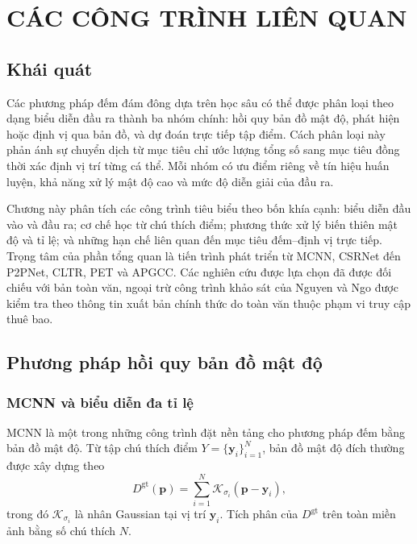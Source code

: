 \chapter{CÁC CÔNG TRÌNH LIÊN QUAN}
\label{chap:related-work}

\section{Khái quát}

Các phương pháp đếm đám đông dựa trên học sâu có thể được phân loại theo dạng biểu diễn đầu ra thành ba nhóm chính: hồi quy bản đồ mật độ, phát hiện hoặc định vị qua bản đồ, và dự đoán trực tiếp tập điểm. Cách phân loại này phản ánh sự chuyển dịch từ mục tiêu chỉ ước lượng tổng số sang mục tiêu đồng thời xác định vị trí từng cá thể. Mỗi nhóm có ưu điểm riêng về tín hiệu huấn luyện, khả năng xử lý mật độ cao và mức độ diễn giải của đầu ra.

Chương này phân tích các công trình tiêu biểu theo bốn khía cạnh: biểu diễn đầu vào và đầu ra; cơ chế học từ chú thích điểm; phương thức xử lý biến thiên mật độ và tỉ lệ; và những hạn chế liên quan đến mục tiêu đếm--định vị trực tiếp. Trọng tâm của phần tổng quan là tiến trình phát triển từ MCNN, CSRNet đến P2PNet, CLTR, PET và APGCC. Các nghiên cứu được lựa chọn đã được đối chiếu với bản toàn văn, ngoại trừ công trình khảo sát của Nguyen và Ngo được kiểm tra theo thông tin xuất bản chính thức do toàn văn thuộc phạm vi truy cập thuê bao.

\section{Phương pháp hồi quy bản đồ mật độ}

\subsection{MCNN và biểu diễn đa tỉ lệ}

MCNN là một trong những công trình đặt nền tảng cho phương pháp đếm bằng bản đồ mật độ. Từ tập chú thích điểm $Y=\{\mathbf y_i\}_{i=1}^{N}$, bản đồ mật độ đích thường được xây dựng theo
\begin{equation}
    D^{\mathrm{gt}}(\mathbf p)
    =\sum_{i=1}^{N}\mathcal K_{\sigma_i}(\mathbf p-\mathbf y_i),
    \label{eq:density-target}
\end{equation}
trong đó $\mathcal K_{\sigma_i}$ là nhân Gaussian tại vị trí $\mathbf y_i$. Tích phân của $D^{\mathrm{gt}}$ trên toàn miền ảnh bằng số chú thích $N$.

